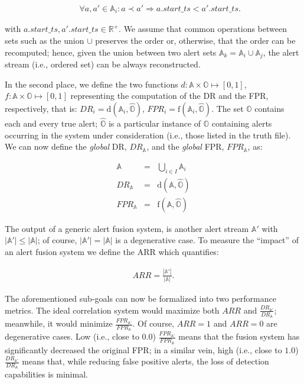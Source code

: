 \begin{eqnarray*}
 &&\forall a, a' \in \mathbb{A}_{i}: a \prec a' \Rightarrow a.start\_ts < a'.start\_ts.
\end{eqnarray*}

\noindent with $a.start\_ts, a'.start\_ts \in \mathbb{R}^{+}$. We
assume that common operations between sets such as the union $\cup$
preserves the order or, otherwise, that the order can be recomputed;
hence, given the union between two alert sets $\mathbb{A}_{k} =
\mathbb{A}_{i} \cup \mathbb{A}_{j}$, the alert stream (i.e., ordered
set) can be always reconstructed.

In the second place, we define the two functions $d: \mathbb{A} \times \mathbb{O} \mapsto [0, 1]$, $f: \mathbb{A} \times \mathbb{O} \mapsto [0, 1]$ representing the computation of the \ac{DR} and the \ac{FPR}, respectively, that is: $DR_{i} = \mathrm{d}(\mathbb{A}_{i}, \hat{\mathbb{O}})$, $FPR_{i} = \mathrm{f}(\mathbb{A}_{i}, \hat{\mathbb{O}})$. The set $\mathbb{O}$ contains each and every true alert; $\hat{\mathbb{O}}$ is a particular instance of $\mathbb{O}$ containing alerts occurring in the system under consideration (i.e., those listed in the truth file). We can now define the \emph{global} DR, $DR_{\mathbb{A}}$, and the \emph{global} \ac{FPR}, $FPR_{\mathbb{A}}$, as:

\begin{eqnarray}\label{eq:global_dr_fpr}
  \mathbb{A} & = & \bigcup_{i \in I} \mathbb{A}_{i}\\
  DR_{\mathbb{A}} & = & \mathrm{d}\left(\mathbb{A}, \hat{\mathbb{O}}\right)\\
  FPR_{\mathbb{A}} & = & \mathrm{f}\left(\mathbb{A}, \hat{\mathbb{O}}\right)
\end{eqnarray}

The output of a generic alert fusion system, is another alert stream $\mathbb{A}'$ with $|\mathbb{A}'| \leq |\mathbb{A}|$; of course, $|\mathbb{A}'| = |\mathbb{A}|$ is a degenerative case. To measure the ``impact'' of an alert fusion system we define the \ac{ARR} which quantifies:

\begin{eqnarray}\label{eq:arr}
  ARR = \frac{|\mathbb{A}'|}{|\mathbb{A}|}.
\end{eqnarray}

The aforementioned sub-goals can now be formalized into two performance metrics. The ideal correlation system would maximize both $ARR$ and $\frac{DR_{\mathbb{A'}}}{DR_{\mathbb{A}}}$; meanwhile, it would minimize $\frac{FPR_{\mathbb{A'}}}{FPR_{\mathbb{A}}}$. Of course, $ARR = 1$ and $ARR = 0$ are degenerative cases. Low (i.e., close to $0.0$) $\frac{FPR_{\mathbb{A'}}}{FPR_{\mathbb{A}}}$ means that the fusion system has significantly decreased the original \ac{FPR}; in a similar vein, high (i.e., close to $1.0$) $\frac{DR_{\mathbb{A'}}}{DR_{\mathbb{A}}}$ means that, while reducing false positive alerts, the loss of detection capabilities is minimal.

